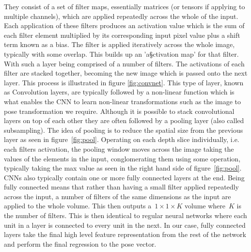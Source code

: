 \documentclass[11pt]{article} %
\begin{document}
They consist of a set of filter maps, essentially matrices (or tensors if applying to multiple channels), which are applied repeatedly across the whole of the input. Each application of these filters produces an activation value which is the sum of each filter element multiplied by its corresponding input pixel value plus a shift term known as a bias. The filter is applied iteratively across the whole image, typically with some overlap. This builds up an 'a§ctivation map' for that filter. With such a layer being comprised of a number of filters. The activations of each filter are stacked together, becoming the new image which is passed onto the next layer. This process is illustrated in figure \ref{fig:convnet}. This type of layer, known as Convolution layers, are typically followed by a non-linear function which is what enables the CNN to learn non-linear transformations such as the image to pose transformation we require. Although it is possible to stack convolutional layers on top of each other they are often followed by a pooling layer (also called subsampling). The idea of pooling is to reduce the spatial size from the previous layer as seen in figure~\ref{fig:pool}. Operating on each depth slice individually, i.e. each filters activation, the pooling window moves across the image taking the values of the elements in the input, conglomerating them using some operation, typically taking the max value as seen in the right hand side of figure~\ref{fig:pool}. CNNs also typically contain one or more fully connected layers at the end. Being fully connected means that rather than having a small filter applied repeatedly across the input, a number of filters of the same dimensions as the input are applied to the whole volume. This then outputs a~$1\times 1 \times K$ volume where~$K$ is the number of filters. This is then identical to regular neural networks where each unit in a layer is connected to every unit in the next. In our case, fully connected layers take the final high level feature representation from the rest of the network and perform the final regression to the pose vector. 
\end{document}
